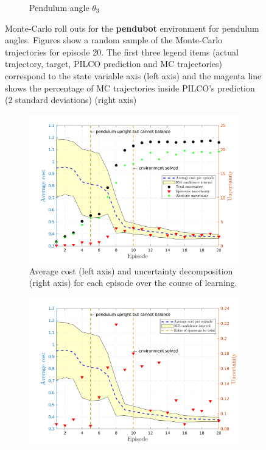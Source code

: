 \begin{figure}[htp!]
\begin{subfigure}[b]{1\linewidth}
    \caption{Pendulum angle $\theta_3$} 
    \label{Fig:Re-pen-pen-angle} 
  \end{subfigure} 

\caption[Monte-Carlo roll outs for \textbf{pendubot} pendulum angles]{Monte-Carlo roll outs for the \textbf{pendubot} environment for pendulum angles. Figures show a random sample of the Monte-Carlo trajectories for episode 20. The first three legend items (actual trajectory, target, PILCO prediction and MC trajectories) correspond to the state variable axis (left axis) and the magenta line shows the percentage of MC trajectories inside PILCO's prediction (2 standard deviations) (right axis)}
\label{Re:pen-MC-roll-outs-2} 
\end{figure}
 
\begin{figure}[htp!]    
   \begin{subfigure}[b]{1\linewidth}
    \centering
    \includegraphics[height=0.4\textheight,width=1\textwidth]{Chapter3/Figures/pen_uncertainty.png} 
    \caption{Average cost (left axis) and uncertainty decomposition (right axis) for each episode over the course of learning.} 
    \label{Fig:Re-pen-uncertainty} 
  \end{subfigure}
  \hspace{\fill}
  \begin{subfigure}[b]{1\linewidth}
    \centering
    \includegraphics[height=0.4\textheight,width=1\textwidth]{Chapter3/Figures/pen_uncertainty_norm.png} 

\end{subfigure}
\end{figure}
